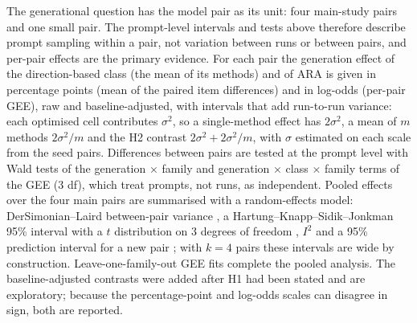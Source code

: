 The generational question has the model pair as its unit: four main-study
pairs and one small pair. The prompt-level intervals and tests above
therefore describe prompt sampling within a pair, not variation between runs
or between pairs, and per-pair effects are the primary evidence. For each pair
the generation effect of the direction-based class (the mean of its methods)
and of ARA is given in percentage points (mean of the paired item differences)
and in log-odds (per-pair GEE), raw and baseline-adjusted, with intervals that
add run-to-run variance: each optimised cell contributes $\sigma^2$, so a
single-method effect has $2\sigma^2$, a mean of $m$ methods $2\sigma^2/m$
and the H2 contrast $2\sigma^2+2\sigma^2/m$, with $\sigma$ estimated on each
scale from the seed pairs. Differences between pairs are tested at the prompt level with Wald
tests of the generation $\times$ family and generation $\times$ class
$\times$ family terms of the GEE (3 df), which treat prompts, not runs, as
independent. Pooled effects over the four main
pairs are summarised with a random-effects model: DerSimonian--Laird
between-pair variance \cite{dersimonian1986meta}, a
Hartung--Knapp--Sidik--Jonkman 95\% interval with a $t$ distribution on 3
degrees of freedom \cite{hartung2001refined,inthout2014hartung}, $I^2$
\cite{higgins2002quantifying} and a 95\% prediction interval for a new pair
\cite{higgins2009reevaluation}; with $k=4$ pairs these intervals are wide by
construction. Leave-one-family-out GEE fits complete the pooled analysis. The
baseline-adjusted contrasts were added after H1 had been stated and are
exploratory; because the percentage-point and log-odds scales can disagree in
sign, both are reported.

